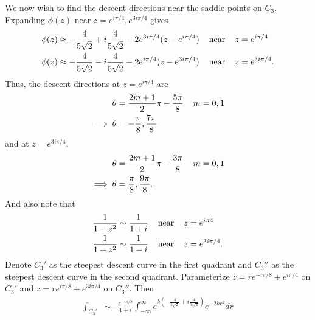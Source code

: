\documentclass{article}
\begin{document}
\begin{itemize}
\begin{itemize}
        We now wish to find the descent directions near the saddle points on $C_3$. Expanding $\phi(z)$ near $z = e^{i\pi/4}, e^{3i\pi/4}$ gives
        \begin{align*}
            \phi(z) &\approx -\frac{4}{5\sqrt{2}} + i\frac{4}{5\sqrt{2}} - 2e^{3i\pi/4}(z - e^{i\pi/4}) \hspace{0.4cm} \text{near} \hspace{0.4cm} z = e^{i\pi/4}\\
            \phi(z) &\approx -\frac{4}{5\sqrt{2}} - i\frac{4}{5\sqrt{2}} - 2e^{i\pi/4}(z - e^{3i\pi/4}) \hspace{0.4cm} \text{near} \hspace{0.4cm} z = e^{3i\pi/4}.
        \end{align*}
        Thus, the descent directions at $z = e^{i\pi/4}$ are 
        \begin{align*}
            \theta &= \frac{2m + 1}{2}\pi - \frac{5\pi}{8} \hspace{0.4cm} m = 0,1\\
            \implies \theta &= -\frac{\pi}{8}, \frac{7\pi}{8}
        \end{align*}
        and at $z = e^{3i\pi/4}$,
        \begin{align*}
            \theta &= \frac{2m + 1}{2}\pi - \frac{3\pi}{8} \hspace{0.4cm} m = 0,1\\
            \implies \theta &= \frac{\pi}{8}, \frac{9\pi}{8}.
        \end{align*}
        And also note that
        \begin{align*}
            \frac{1}{1 + z^2} &\sim \frac{1}{1 + i} \hspace{0.4cm} \text{near} \hspace{0.4cm} z = e^{i\pi4}\\
            \frac{1}{1 + z^2} &\sim \frac{1}{1 - i} \hspace{0.4cm} \text{near} \hspace{0.4cm} z = e^{3i\pi/4}.
        \end{align*}
        Denote $C_3'$ as the steepest descent curve in the first quadrant and $C_3''$ as the steepest descent curve in the second quadrant. Parameterize $z = re^{-i\pi/8} + e^{i\pi/4}$ on $C_3'$ and $z = re^{i\pi/8} + e^{3i\pi/4}$ on $C_3''$. Then
        \begin{align*}
            \int_{C_3'} &\sim -\frac{e^{-i\pi/8}}{1 + i}\int_{-\infty}^{\infty} e^{k\left(-\frac{4}{5\sqrt{2}} + i\frac{4}{5\sqrt{2}}\right)}e^{-2kr^2}dr \\

\end{align*}
\end{itemize}
\end{itemize}
\end{document}
